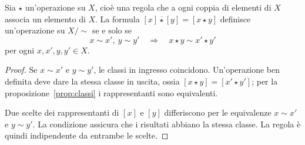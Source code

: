 \begin{proposizione}
Sia $\star$ un'operazione su $X$, cioè una regola che a ogni coppia di elementi di $X$ associa un elemento di $X$. La formula $[x]\mathbin{\overline\star}[y]=[x\star y]$ definisce un'operazione su $X/{\sim}$ se e solo se
\[
x\sim x',\ y\sim y'\quad\Longrightarrow\quad x\star y\sim x'\star y'
\]
per ogni $x,x',y,y'\in X$.
\end{proposizione}
\begin{proof}
\passomath{\Rightarrow} Se $x\sim x'$ e $y\sim y'$, le classi in ingresso coincidono. Un'operazione ben definita deve dare la stessa classe in uscita, ossia $[x\star y]=[x'\star y']$; per la proposizione~\ref{prop:classi} i rappresentanti sono equivalenti.

\passomath{\Leftarrow} Due scelte dei rappresentanti di $[x]$ e $[y]$ differiscono per le equivalenze $x\sim x'$ e $y\sim y'$. La condizione assicura che i risultati abbiano la stessa classe. La regola è quindi indipendente da entrambe le scelte.
\end{proof}
